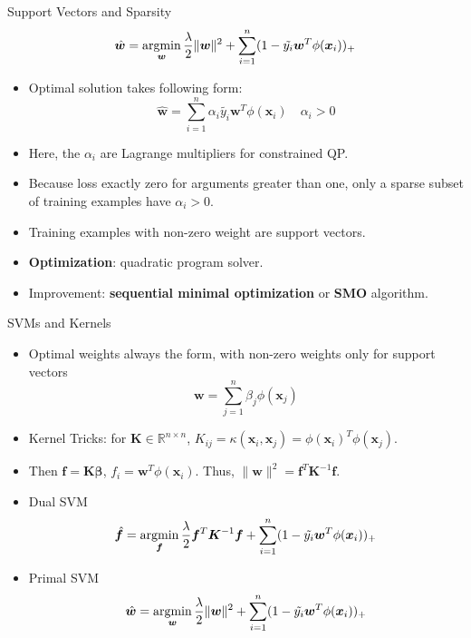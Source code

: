 \documentclass[10pt,mathserif]{beamer}
\begin{document}
\begin{frame}{Support Vectors and Sparsity}
\begin{equation*}
    \hat{\bm{w}} = \mathop{\rm argmin}_{\bm{w}} \frac{\lambda}{2}\|\bm{w}\|^2 + \sum_{i=1}^n (1-\tilde{y_i} \bm{w}^T\phi(\bm{x}_i))_+
\end{equation*}
\begin{itemize}
    \item Optimal solution takes following form:
    \begin{equation*}
        \hat{\bm{w}} = \sum_{i=1}^n \alpha_i \tilde{y_i} \bm{w}^T\phi(\bm{x}_i)\quad\alpha_i>0
    \end{equation*}
    \item Here, the $\alpha_i$ are Lagrange multipliers for constrained QP.
    \item Because loss exactly zero for arguments greater than one, only a sparse subset of training examples have $\alpha_i>0$.
    \item Training examples with non-zero weight are support vectors.
    \item \textbf{Optimization}: quadratic program solver.
    \item Improvement: \textbf{sequential minimal optimization} or \textbf{SMO} algorithm.
\end{itemize}
\end{frame}

\begin{frame}{SVMs and Kernels}
\begin{itemize}
    \item Optimal weights always the form, with non-zero weights only for support vectors
    \begin{equation*}
        \bm{w} = \sum_{j=1}^n \beta_j \phi(\bm{x}_j)
    \end{equation*}
    \item Kernel Tricks: for $\bm{K} \in \mathbb{R}^{n \times n}$, $K_{ij} = \kappa(\bm{x}_i,\bm{x}_j) = \phi(\bm{x}_i)^T \phi(\bm{x}_j)$.
    \item Then $\bm{f} = \bm{K}\bm{\beta}$,  $f_i = \bm{w}^T\phi(\bm{x}_i)$. Thus, $\|\bm{w}\|^2 = \bm{f}^T\bm{K}^{-1}\bm{f}$.
    \item Dual SVM
    \begin{equation*}
        \hat{\bm{f}} = \mathop{\rm argmin}_{\bm{f}} \frac{\lambda}{2}\bm{f}^T \bm{K}^{-1}\bm{f} + \sum_{i=1}^n (1-\tilde{y_i} \bm{w}^T\phi(\bm{x}_i))_+
    \end{equation*}
    \item Primal SVM
    \begin{equation*}
        \hat{\bm{w}} = \mathop{\rm argmin}_{\bm{w}} \frac{\lambda}{2}\|\bm{w}\|^2 + \sum_{i=1}^n (1-\tilde{y_i} \bm{w}^T\phi(\bm{x}_i))_+
    \end{equation*}
\end{itemize}
\end{frame}
\end{document}
